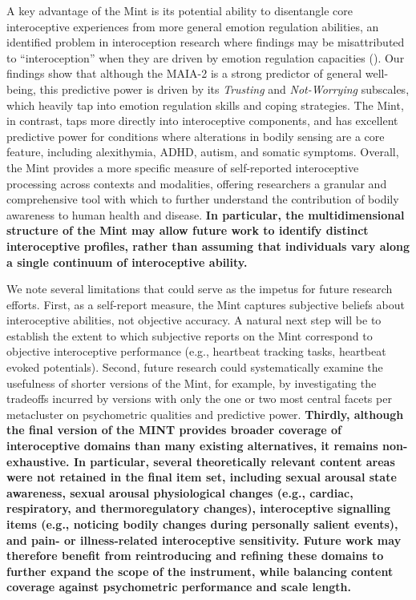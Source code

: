 \documentclass[
  man,
  floatsintext,
  longtable,
  nolmodern,
  notxfonts,
  notimes,
  mask,
  colorlinks=true,linkcolor=blue,citecolor=blue,urlcolor=blue]{apa7}
\begin{document}
A key advantage of the Mint is its potential ability to disentangle core
interoceptive experiences from more general emotion regulation
abilities, an identified problem in interoception research where
findings may be misattributed to ``interoception'' when they are driven
by emotion regulation capacities
(). Our findings
show that although the MAIA-2 is a strong predictor of general
well-being, this predictive power is driven by its \emph{Trusting} and
\emph{Not-Worrying} subscales, which heavily tap into emotion regulation
skills and coping strategies. The Mint, in contrast, taps more directly
into interoceptive components, and has excellent predictive power for
conditions where alterations in bodily sensing are a core feature,
including alexithymia, ADHD, autism, and somatic symptoms. Overall, the
Mint provides a more specific measure of self-reported interoceptive
processing across contexts and modalities, offering researchers a
granular and comprehensive tool with which to further understand the
contribution of bodily awareness to human health and disease. \textbf{In
particular, the multidimensional structure of the Mint may allow future
work to identify distinct interoceptive profiles, rather than assuming
that individuals vary along a single continuum of interoceptive
ability.}

We note several limitations that could serve as the impetus for future
research efforts. First, as a self-report measure, the Mint captures
subjective beliefs about interoceptive abilities, not objective
accuracy. A natural next step will be to establish the extent to which
subjective reports on the Mint correspond to objective interoceptive
performance (e.g., heartbeat tracking tasks, heartbeat evoked
potentials). Second, future research could systematically examine the
usefulness of shorter versions of the Mint, for example, by
investigating the tradeoffs incurred by versions with only the one or
two most central facets per metacluster on psychometric qualities and
predictive power. \textbf{Thirdly, although the final version of the
MINT provides broader coverage of interoceptive domains than many
existing alternatives, it remains non-exhaustive. In particular, several
theoretically relevant content areas were not retained in the final item
set, including sexual arousal state awareness, sexual arousal
physiological changes (e.g., cardiac, respiratory, and thermoregulatory
changes), interoceptive signalling items (e.g., noticing bodily changes
during personally salient events), and pain- or illness-related
interoceptive sensitivity. Future work may therefore benefit from
reintroducing and refining these domains to further expand the scope of
the instrument, while balancing content coverage against psychometric
performance and scale length.}
\end{document}
